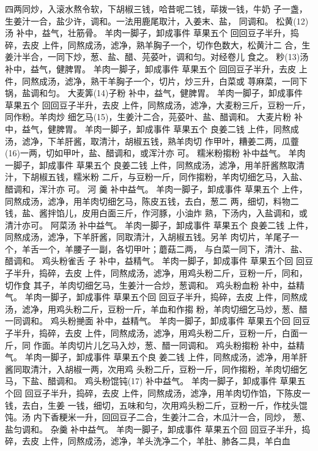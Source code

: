 \documentclass[12pt,UTF8]{ctexbook}
\begin{document}
四两同炒，入滚水熬令软，下胡椒三钱，哈昔呢二钱，荜拨一钱，牛奶
子一盏，生姜汁一合，盐少许，调和。一法用鹿尾取汁，入姜末、盐，
同调和。
松黄(12)汤 补中，益气，壮筋骨。
羊肉一脚子，卸成事件 草果五个 回回豆子半升，捣碎，去皮
上件，同熬成汤，滤净，熟羊胸子一个，切作色数大，松黄汁二
合，生姜汁半合，一同下炒，葱、盐、醋、芫荽叶，调和匀。对经卷儿
食之。
粆(13)汤 补中，益气，健脾胃。
羊肉一脚子，卸成事件 草果五个 回回豆子半升，去皮
上件，同熬成汤，滤净，熟干羊胸子一个，切片，炒三升，白菜或
荨麻菜，一同下锅，盐调和匀。
大麦筭(14)子粉 补中，益气，健脾胃。
羊肉一脚子，卸成事件 草果五个 回回豆子半升，去皮
上件，同熬成汤，滤净，大麦粉三斤，豆粉一斤，同作粉。羊肉炒
细乞马(15)，生姜汁二合，芫荽叶、盐、醋调和。
大麦片粉 补中，益气，健脾胃。
羊肉一脚子，卸成事件 草果五个 良姜二钱
上件，同熬成汤，滤净，下羊肝酱，取清汁，胡椒五钱，熟羊肉切
作甲叶，糟姜二两，瓜虀(16)一两，切如甲叶，盐、醋调和，或浑汁亦
可。
糯米粉搊粉 补中益气。
羊肉一脚子，卸成事件 草果五个 良姜二钱
上件，同熬成汤，滤净，用羊肝酱熬取清汁，下胡椒五钱，糯米粉
二斤，与豆粉一斤，同作搊粉，羊肉切细乞马，入盐、醋调和，浑汁亦
可。
河 羹 补中益气。
羊肉一脚子，卸成事件 草果五个
上件，同熬成汤，滤净，用羊肉切细乞马，陈皮五钱，去白，葱二
两，细切，料物二钱，盐、酱拌馅儿，皮用白面三斤，作河豚，小油炸
熟，下汤内，入盐调和，或清汁亦可。
阿菜汤 补中益气。
羊肉一脚子，卸成事件 草果五个 良姜二钱
上件，同熬成汤，滤净，下羊肝酱，同取清汁，入胡椒五钱。另羊
肉切片，羊尾子一个，羊舌一个，羊腰子一副，各切甲叶；蘑菇二两，
与白菜一同下，清汁、盐、醋调和。
鸡头粉雀舌 子 补中，益精气。
羊肉一脚子，卸成事件 草果五个回 回豆子半升，捣碎，去皮
上件，同熬成汤，滤净，用鸡头粉二斤，豆粉一斤，同和，切作食
其子，羊肉切细乞马，生姜汁一合炒，葱调和。
鸡头粉血粉 补中，益精气。
羊肉一脚子，卸成事件 草果五个回 回豆子半升，捣碎，去皮
上件，同熬成汤，滤净，用鸡头粉二斤，豆粉一斤，羊血和作搊
粉，羊肉切细乞马炒，葱、醋一同调和。
鸡头粉撧面 补中，益精气。
羊肉一脚子，卸成事件 草果五个回 回豆子半升，捣碎，去皮
上件，同熬成汤，滤净，用鸡头粉二斤，豆粉一斤，白面一斤，同
作面。羊肉切片儿乞马入炒，葱、醋一同调和。
鸡头粉搊粉 补中，益精气。
羊肉一脚子，卸成事件 草果五个良 姜二钱
上件，同熬成汤，滤净，用羊肝酱同取清汁，入胡椒一两，次用鸡
头粉二斤，豆粉一斤，同作搊粉，羊肉切细乞马，下盐、醋调和。
鸡头粉馄钝(17) 补中益气。
羊肉一脚子，卸成事件 草果五个回 回豆子半升，捣碎，去皮
上件，同熬成汤，滤净，用羊肉切作馅，下陈皮一钱，去白，生姜
一钱，细切，五味和匀，次用鸡头粉二斤，豆粉一斤，作枕头馄饨。汤
内下香粳米一升，回回豆子二合，生姜汁二合，木瓜汁一合，同炒，
葱、盐匀调和。
杂羹 补中益气。
羊肉一脚子，卸成事件 草果五个回 回豆子半升，捣碎，去皮
上件，同熬成汤，滤净，羊头洗净二个，羊肚、肺各二具，羊白血
\end{document}
